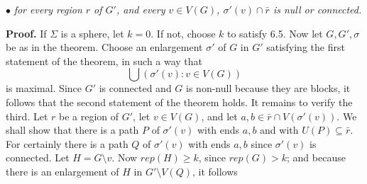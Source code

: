 \hspace*{12pt}$\bullet$ \textit{for every region $r$ of $G'$, and every $v\in V(G)$, $\sigma'(v)\cap \bar{r}$ is null or connected.}

\textbf{Proof.} If $\Sigma$ is a sphere, let $k = 0$. If not, choose $k$ to satisfy 6.5. Now let $G, G', \sigma$ be as in the theorem. Choose an enlargement $\sigma'$ of $G$ in $G'$ satisfying the first statement of the theorem, in such a way that
\begin{equation*}
\bigcup(\sigma'(v) : v\in V(G))
\end{equation*}
is maximal. Since $G'$ is connected and $G$ is non-null because they are blocks, it follows that the second statement of the theorem holds. It remains to verify the third. Let $r$ be a region of $G'$, let $v\in V(G)$, and let $a, b\in \bar{r}\cap V(\sigma'(v))$. We shall show that there is a path $P$ of $\sigma'(v)$ with ends $a, b$ and with $U(P)\subseteq \bar{r}$. For certainly there is a path $Q$ of $\sigma'(v)$ with ends $a, b$ since $\sigma'(v)$ is connected. Let $H = G\setminus v$. Now $rep(H)\ge k$, since $rep(G)>k$; and because there is an enlargement of $H$ in $G'\setminus V(Q)$, it follows
